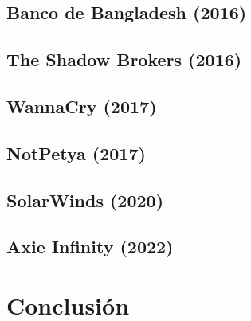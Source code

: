 \documentclass{article}
\begin{document}
\subsection{Banco de Bangladesh (2016)}


\subsection{The Shadow Brokers (2016)}

\subsection{WannaCry (2017)}

\subsection{NotPetya (2017)}


\subsection{SolarWinds (2020)}

\subsection{Axie Infinity (2022)}

\section{Conclusión}

\newpage
\printbibliography
\end{document}
